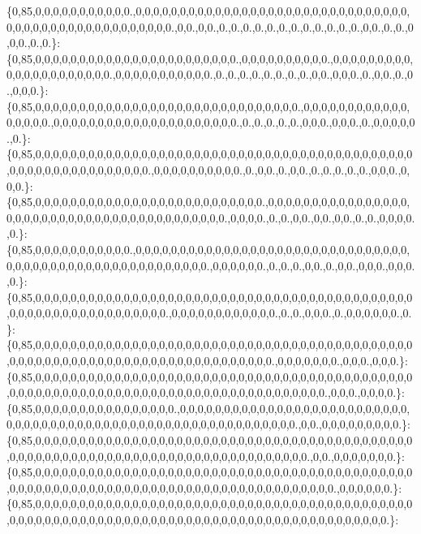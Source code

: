 \{0,85,0,0,0,0,0,0,0,0,0,0,0.,0,0,0,0,0,0,0,0,0,0,0,0,0,0,0,0,0,0,0,0,0,0,0,0,0,0,0,0,0,0,0,0,0,0,0,0,0,0,0,0,0,0,0,0,0,0,0,0,0,0.,0,0.,0,0.,0.,0.,0.,0.,0.,0.,0.,0.,0.,0.,0.,0.,0,0.,0.,0.,0,0,0.,0.,0.\}\+: \{0,85,0,0,0,0,0,0,0,0,0,0,0,0,0,0,0,0,0,0,0,0,0,0,0.,0,0,0,0,0,0,0,0,0,0.,0,0,0,0,0,0,0,0,0,0,0,0,0,0,0,0,0,0,0,0,0.,0,0,0,0,0,0,0,0,0,0,0.,0.,0.,0.,0.,0.,0.,0.,0.,0,0.,0,0,0.,0.,0,0.,0.,0.,0,0,0.\}\+: \{0,85,0,0,0,0,0,0,0,0,0,0,0,0,0,0,0,0,0,0,0,0,0,0,0,0,0,0,0,0,0,0.,0,0,0,0,0,0,0,0,0,0,0,0,0,0,0,0,0.,0,0,0,0,0,0,0,0,0,0,0,0,0,0,0,0,0,0,0,0,0.,0.,0.,0.,0.,0.,0,0,0.,0,0,0.,0.,0,0,0,0,0.,0.\}\+: \{0,85,0,0,0,0,0,0,0,0,0,0,0,0,0,0,0,0,0,0,0,0,0,0,0,0,0,0,0,0,0,0,0,0,0,0,0,0,0,0,0,0,0,0,0,0,0,0,0,0,0,0,0,0,0,0,0,0,0,0,0.,0,0,0,0,0,0,0,0,0,0.,0.,0,0.,0.,0,0.,0.,0.,0.,0.,0.,0,0,0.,0,0,0.\}\+: \{0,85,0,0,0,0,0,0,0,0,0,0,0,0,0,0,0,0,0,0,0,0,0,0,0,0,0,0.,0,0,0,0,0,0,0,0,0,0,0,0,0,0,0,0,0,0,0,0,0,0,0,0,0,0,0,0,0,0,0,0,0,0,0,0,0,0,0,0,0.,0,0,0,0.,0.,0.,0,0.,0,0.,0,0.,0.,0.,0,0,0,0.,0.\}\+: \{0,85,0,0,0,0,0,0,0,0,0,0,0.,0,0,0,0,0,0,0,0,0,0,0,0,0,0,0,0,0,0,0,0,0,0,0,0,0,0,0,0,0,0,0,0,0,0,0,0,0,0,0,0,0,0,0,0,0,0,0,0,0,0,0,0,0,0.,0,0,0,0,0,0.,0.,0.,0.,0,0.,0.,0,0.,0,0,0.,0,0,0.,0.\}\+: \{0,85,0,0,0,0,0,0,0,0,0,0,0,0,0,0,0,0,0,0,0,0,0,0,0,0,0,0,0,0,0,0,0,0,0,0,0,0,0,0,0,0,0,0,0,0,0,0,0,0,0,0,0,0,0,0,0,0,0,0,0,0,0.,0,0,0,0,0,0,0,0,0,0,0,0.,0.,0.,0,0,0.,0.,0,0,0,0,0,0.,0.\}\+: \{0,85,0,0,0,0,0,0,0,0,0,0,0,0,0,0,0,0,0,0,0,0,0,0,0,0,0,0,0,0,0,0,0,0,0,0,0,0,0,0,0,0,0,0,0,0,0,0,0,0,0,0,0,0,0,0,0,0,0,0,0,0,0,0,0,0,0,0,0,0,0,0,0,0,0.,0,0,0,0,0,0,0.,0,0,0.,0,0,0.\}\+: \{0,85,0,0,0,0,0,0,0,0,0,0,0,0,0,0,0,0,0,0,0,0,0,0,0,0,0,0,0,0,0,0,0,0,0,0,0,0,0,0,0,0,0,0,0,0,0,0,0,0,0,0,0,0,0,0,0,0,0,0,0,0,0,0,0,0,0,0,0,0,0,0,0,0,0,0,0,0,0,0,0.,0,0,0.,0,0,0,0.\}\+: \{0,85,0,0,0,0,0,0,0,0,0,0,0,0,0,0,0,0.,0,0,0,0,0,0,0,0,0,0,0,0,0,0,0,0,0,0,0,0,0,0,0,0,0,0,0,0,0,0,0,0,0,0,0,0,0,0,0,0,0,0,0,0,0,0,0,0,0,0,0,0,0,0,0,0,0,0,0.,0,0.,0,0,0,0,0,0,0,0,0.\}\+: \{0,85,0,0,0,0,0,0,0,0,0,0,0,0,0,0,0,0,0,0,0,0,0,0,0,0,0,0,0,0,0,0,0,0,0,0,0,0,0,0,0,0,0,0,0,0,0,0,0,0,0,0,0,0,0,0,0,0,0,0,0,0,0,0,0,0,0,0,0,0,0,0,0,0,0,0,0,0,0.,0,0.,0,0,0,0,0,0,0.\}\+: \{0,85,0,0,0,0,0,0,0,0,0,0,0,0,0,0,0,0,0,0,0,0,0,0,0,0,0,0,0,0,0,0,0,0,0,0,0,0,0,0,0,0,0,0,0,0,0,0,0,0,0,0,0,0,0,0,0,0,0,0,0,0,0,0,0,0,0,0,0,0,0,0,0,0,0,0,0,0,0,0,0,0.,0,0,0,0,0,0.\}\+: \{0,85,0,0,0,0,0,0,0,0,0,0,0,0,0,0,0,0,0,0,0,0,0,0,0,0,0,0,0,0,0,0,0,0,0,0,0,0,0,0,0,0,0,0,0,0,0,0,0,0,0,0,0,0,0,0,0,0,0,0,0,0,0,0,0,0,0,0,0,0,0,0,0,0,0,0,0,0,0,0,0,0,0,0,0,0,0,0.\}\+: 